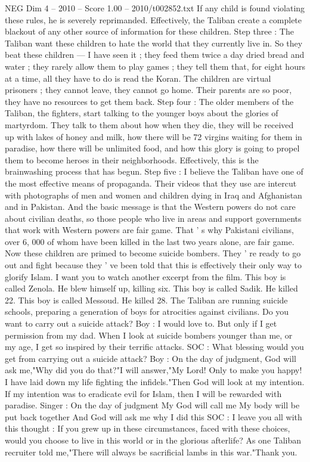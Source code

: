 \begin{textsample}{NEG Dim 4 – 2010 – Score 1.00 – 2010/t002852.txt}
If any child is found violating these rules, he is severely reprimanded.
Effectively, the Taliban create a complete blackout of any other source of information for these children.
Step three : The Taliban want these children to hate the world that they currently live in.
So they beat these children — I have seen it ; they feed them twice a day dried bread and water ; they rarely allow them to play games ; they tell them that, for eight hours at a time, all they have to do is read the Koran.
The children are virtual prisoners ; they cannot leave, they cannot go home.
Their parents are so poor, they have no resources to get them back.
Step four : The older members of the Taliban, the fighters, start talking to the younger boys about the glories of martyrdom.
They talk to them about how when they die, they will be received up with lakes of honey and milk, how there will be 72 virgins waiting for them in paradise, how there will be unlimited food, and how this glory is going to propel them to become heroes in their neighborhoods.
Effectively, this is the brainwashing process that has begun.
Step five : I believe the Taliban have one of the most effective means of propaganda.
Their videos that they use are intercut with photographs of men and women and children dying in Iraq and Afghanistan and in Pakistan.
And the basic message is that the Western powers do not care about civilian deaths, so those people who live in areas and support governments that work with Western powers are fair game.
That ' s why Pakistani civilians, over 6, 000 of whom have been killed in the last two years alone, are fair game.
Now these children are primed to become suicide bombers.
They ' re ready to go out and fight because they ' ve been told that this is effectively their only way to glorify Islam.
I want you to watch another excerpt from the film.
This boy is called Zenola.
He blew himself up, killing six.
This boy is called Sadik.
He killed 22.
This boy is called Messoud.
He killed 28.
The Taliban are running suicide schools, preparing a generation of boys for atrocities against civilians.
Do you want to carry out a suicide attack?
Boy : I would love to.
But only if I get permission from my dad.
When I look at suicide bombers younger than me, or my age, I get so inspired by their terrific attacks.
SOC : What blessing would you get from carrying out a suicide attack?
Boy : On the day of judgment, God will ask me,"Why did you do that?"I will answer,"My Lord!
Only to make you happy!
I have laid down my life fighting the infidels."Then God will look at my intention.
If my intention was to eradicate evil for Islam, then I will be rewarded with paradise.
Singer : On the day of judgment My God will call me My body will be put back together And God will ask me why I did this SOC : I leave you all with this thought : If you grew up in these circumstances, faced with these choices, would you choose to live in this world or in the glorious afterlife?
As one Taliban recruiter told me,"There will always be sacrificial lambs in this war."Thank you.

\end{textsample}

